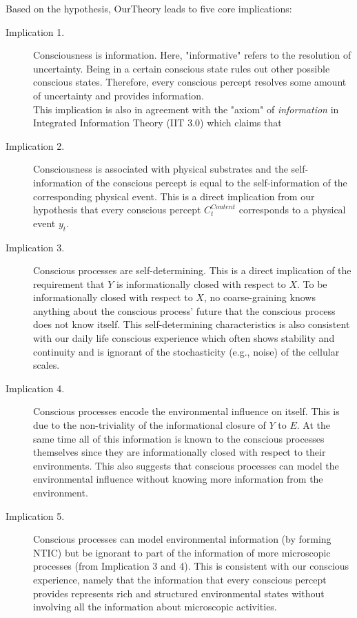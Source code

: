 \documentclass[utf8]{article}
\begin{document}
        Based on the hypothesis, \ac{OurTheory} leads to five core implications: 
        \begin{description}
            \item[Implication 1.] 
            Consciousness is information. Here, "informative" refers to the resolution of uncertainty. Being in a certain conscious state rules out other possible conscious states. Therefore, every conscious percept resolves some amount of uncertainty and provides information. \\ 
            This implication is also in agreement with the "axiom" of \textit{information} in Integrated Information Theory (IIT 3.0) which claims that 
            
            \item[Implication 2.] 
            Consciousness is associated with physical substrates and the self-information of the conscious percept is equal to the self-information of the corresponding physical event. This is a direct implication from our hypothesis that every conscious percept $C_t^{Content}$ corresponds to a physical event $y_t$. 
            
            
            \item[Implication 3.] 
            Conscious processes are self-determining. This is a direct implication of the requirement that $Y$ is informationally closed with respect to $X$. To be informationally closed with respect to $X$, no coarse-graining knows anything about the conscious process' future that the conscious process does not know itself. This self-determining characteristics is also consistent with our daily life conscious experience which often shows stability and continuity and is ignorant of the stochasticity (e.g., noise) of the cellular scales.
            
            \item[Implication 4.] 
            Conscious processes encode the environmental influence on itself. This is due to the non-triviality of the informational closure of $Y$ to $E$. At the same time all of this information is known to the conscious processes themselves since they are informationally closed with respect to their environments. This also suggests that conscious processes can model the environmental influence without knowing more information from the environment.
            
            \item[Implication 5.]
            Conscious processes can model environmental information (by forming NTIC) but be ignorant to part of the information of more microscopic processes (from Implication 3 and 4). This is consistent with our conscious experience, namely that the information that every conscious percept provides represents rich and structured environmental states without involving all the information about microscopic activities.
        \end{description}
		
\end{document}
